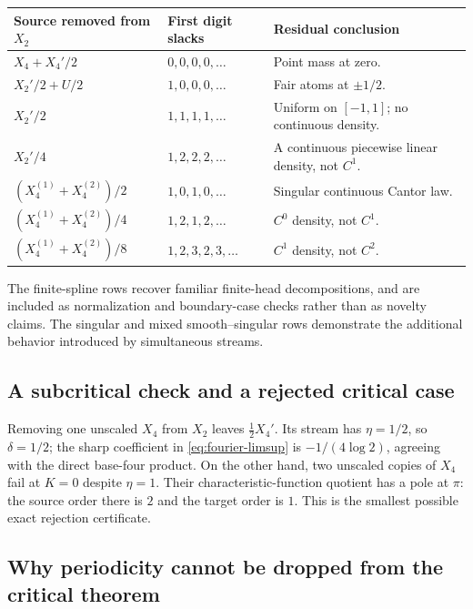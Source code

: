 \documentclass[11pt,a4paper]{article}
\theoremstyle{remark}
\begin{document}
\begin{center}
\begin{tabularx}{\textwidth}{@{}p{}p{}X@{}}
\toprule
Source removed from $X_2$ & First digit slacks & Residual conclusion \\
\midrule
$X_4+X_4'/2$ & $0,0,0,0,\ldots$ & Point mass at zero. \\
$X_2'/2+U/2$ & $1,0,0,0,\ldots$ & Fair atoms at $\pm1/2$. \\
$X_2'/2$ & $1,1,1,1,\ldots$ & Uniform on $[-1,1]$; no continuous density. \\
$X_2'/4$ & $1,2,2,2,\ldots$ & A continuous piecewise linear density, not $C^1$. \\
$(X_4^{(1)}+X_4^{(2)})/2$ & $1,0,1,0,\ldots$ & Singular continuous Cantor law. \\
$(X_4^{(1)}+X_4^{(2)})/4$ & $1,2,1,2,\ldots$ & $C^0$ density, not $C^1$. \\
$(X_4^{(1)}+X_4^{(2)})/8$ & $1,2,3,2,3,\ldots$ & $C^1$ density, not $C^2$. \\
\bottomrule
\end{tabularx}
\end{center}

The finite-spline rows recover familiar finite-head decompositions, and are
included as normalization and boundary-case checks rather than as novelty
claims. The singular and mixed smooth--singular rows demonstrate the additional
behavior introduced by simultaneous streams.

\subsection{A subcritical check and a rejected critical case}

Removing one unscaled $X_4$ from $X_2$ leaves $\tfrac12X_4'$. Its stream has
$\eta=1/2$, so $\delta=1/2$; the sharp coefficient in
\eqref{eq:fourier-limsup} is $-1/(4\log2)$, agreeing with the direct base-four
product. On the other hand, two unscaled copies of $X_4$ fail at $K=0$ despite
$\eta=1$. Their characteristic-function quotient has a pole at $\pi$: the
source order there is $2$ and the target order is $1$. This is the smallest
possible exact rejection certificate.

\subsection{Why periodicity cannot be dropped from the critical theorem}
\end{document}
